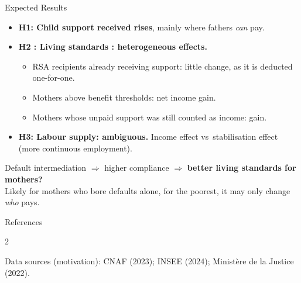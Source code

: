 \documentclass[aspectratio=169,10pt]{beamer}
\begin{document}

\begin{frame}{Expected Results}


\vspace{0.2cm}
\begin{itemize}
  \setlength{\itemsep}{0.2cm}
  \item \textbf{H1: Child support received rises}, mainly where fathers \emph{can} pay.

  
  \item \textbf{H2 : Living standards : heterogeneous effects.}
  \begin{itemize}
      \item RSA recipients already receiving support: little change, as it is deducted one-for-one. 
      \item Mothers above benefit thresholds: net income gain.
      \item Mothers whose unpaid support was still counted as income: gain.
  \end{itemize}
  \item \textbf{H3: Labour supply: ambiguous.} Income effect vs\ stabilisation effect (more continuous employment).
\end{itemize}

\vspace{0.15cm}
\begin{keybox}
  \centering
  Default intermediation $\Rightarrow$ higher compliance $\Rightarrow$ \textbf{better living standards for mothers?}\\[0.05cm]
  {\small Likely for mothers who bore defaults alone, for the poorest, it may only change \emph{who} pays.}
\end{keybox}

\end{frame}

\begin{frame}[noframenumbering]{References}
\vspace{-0.3cm}
\scriptsize
\begin{multicols}{2}
  \setlength{\parskip}{3pt}
  \printbibliography[heading=none]


  {\color{textgrey}Data sources (motivation): CNAF (2023); INSEE (2024); Minist\`ere de la Justice (2022).}
\end{multicols}
\end{frame}
\end{document}
